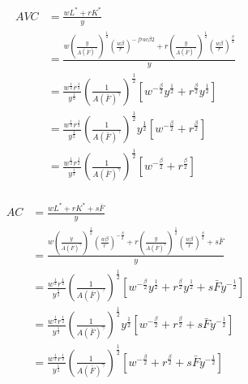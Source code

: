 \documentclass[UTF8,titlepage]{article}
\numberwithin{figure}{section}
\begin{document}
\begin{enumerate}
\begin{align}
    \begin{split}
        AVC &= \frac{wL^{*} + rK^{*}}{y} \\
&= \frac{w\left(\frac{y}{A(\bar{F})^{\gamma}}\right)^{\frac{1}{2}}\left(\frac{w\beta}{r}\right)^{-\
frac{\beta}{2}} + r\left(\frac{y}{A(\bar{F})^{\gamma}}\right)^{\frac{1}{2}}\left(\frac{w\beta}{r}\right)^{\frac{\beta}{2}}}{y} \\
&= \frac{w^{\frac{1}{2}}r^{\frac{1}{2}}}{y^{\frac{1}{2}}} \left(\frac{1}{A(\bar{F})^{\gamma}}\right)^{\frac{1}{2}} \left[w^{-\frac{\beta}{2}}y^{\frac{1}{2}} + r^{\frac{\beta}{2}}y^{\frac{1}{2}}\right] \\
&= \frac{w^{\frac{1}{2}}r^{\frac{1}{2}}}{y^{\frac{1}{2}}} \left(\frac{1}{A(\bar{F})^{\gamma}}\right)^{\frac{1}{2}} y^{\frac{1}{2}} \left[w^{-\frac{\beta}{2}} + r^{\frac{\beta}{2}}\right] \\
&= \frac{w^{\frac{1}{2}}r^{\frac{1}{2}}}{y^{\frac{1}{2}}} \left(\frac{1}{A(\bar{F})^{\gamma}}\right)^{\frac{1}{2}} \left[w^{-\frac{\beta}{2}} + r^{\frac{\beta}{2}}\right]  
    \end{split}
\end{align}



\begin{align}
    \begin{split}
        AC &= \frac{wL^{*} + rK^{*} + s\bar{F}}{y} \\
&= \frac{w\left(\frac{y}{A(\bar{F})^{\gamma}}\right)^{\frac{1}{2}}\left(\frac{w\beta}{r}\right)^{-\frac{\beta}{2}} + r\left(\frac{y}{A(\bar{F})^{\gamma}}\right)^{\frac{1}{2}}\left(\frac{w\beta}{r}\right)^{\frac{\beta}{2}} + s\bar{F}}{y} \\
&= \frac{w^{\frac{1}{2}}r^{\frac{1}{2}}}{y^{\frac{1}{2}}} \left(\frac{1}{A(\bar{F})^{\gamma}}\right)^{\frac{1}{2}} \left[w^{-\frac{\beta}{2}}y^{\frac{1}{2}} + r^{\frac{\beta}{2}}y^{\frac{1}{2}} + s\bar{F}y^{-\frac{1}{2}}\right] \\
&= \frac{w^{\frac{1}{2}}r^{\frac{1}{2}}}{y^{\frac{1}{2}}} \left(\frac{1}{A(\bar{F})^{\gamma}}\right)^{\frac{1}{2}} y^{\frac{1}{2}} \left[w^{-\frac{\beta}{2}} + r^{\frac{\beta}{2}} + s\bar{F}y^{-\frac{1}{2}}\right] \\
&= \frac{w^{\frac{1}{2}}r^{\frac{1}{2}}}{y^{\frac{1}{2}}} \left(\frac{1}{A(\bar{F})^{\gamma}}\right)^{\frac{1}{2}} \left[w^{-\frac{\beta}{2}} + r^{\frac{\beta}{2}} + s\bar{F}y^{-\frac{1}{2}}\right]
    \end{split}
\end{align}



\end{enumerate}
\end{document}
